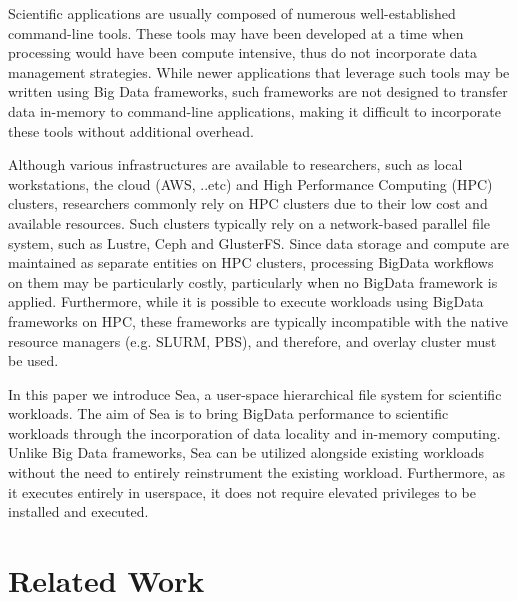 \documentclass[10pt,journal,compsoc]{IEEEtran}
\begin{document}
Scientific applications are usually composed of numerous well-established command-line tools. These tools
may have been developed at a time when processing would have been compute intensive, thus do not incorporate
data management strategies. While newer applications
that leverage such tools may be written using Big Data frameworks, such frameworks are not designed to transfer
data in-memory to command-line applications, making it difficult to incorporate these tools without additional
overhead.

Although various infrastructures are available to researchers, such as local workstations, the cloud (AWS, ..etc) and 
High Performance Computing (HPC) clusters, researchers commonly rely on HPC clusters due to their low cost and available
resources. Such clusters typically rely on a network-based parallel file system, such as Lustre, Ceph and GlusterFS.
Since data storage and compute are maintained as separate entities on HPC clusters, processing BigData workflows on them
may be particularly costly, particularly when no BigData framework is applied. Furthermore, while it is possible to execute
workloads using BigData frameworks on HPC, these frameworks are typically incompatible with the native resource managers (e.g. SLURM, PBS),
and therefore, and overlay cluster must be used.

In this paper we introduce Sea, a user-space hierarchical file system for scientific workloads. The aim of Sea
is to bring BigData performance to scientific workloads through the incorporation of data locality and
in-memory computing. Unlike Big Data frameworks, Sea can be utilized alongside existing workloads without
the need to entirely reinstrument the existing workload. Furthermore, as it executes entirely in userspace,
it does not require elevated privileges to be installed and executed.







\section{Related Work}
\end{document}
